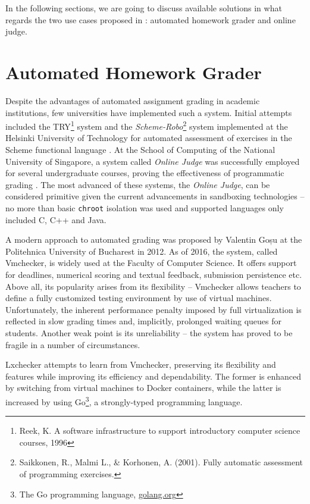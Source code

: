 In the following sections, we are going to discuss available solutions in what regards the two use cases proposed in : automated homework grader and online judge.


\section{Automated Homework Grader}
\label{sec:homework}

Despite the advantages of automated assignment grading in academic institutions, few universities have implemented such a system. Initial attempts included the TRY\footnote{Reek, K. A software infrastructure to support introductory computer science courses, 1996} system and the \textit{Scheme-Robo}\footnote{Saikkonen, R., Malmi L., \& Korhonen, A. (2001). Fully automatic assessment of programming exercises.} system implemented at the Helsinki University of Technology for automated assessment of exercises in the Scheme functional language \cite{cheang}. At the School of Computing of the National University of Singapore, a system called \textit{Online Judge} was successfully employed for several undergraduate courses, proving the effectiveness of programmatic grading \cite{cheang}. The most advanced of these systems, the \textit{Online Judge}, can be considered primitive given the current advancements in sandboxing technologies -- no more than basic \texttt{chroot} isolation was used and supported languages only included C, C++ and Java.

A modern approach to automated grading was proposed by Valentin Goșu\cite{gosu} at the Politehnica University of Bucharest in 2012. As of 2016, the system, called Vmchecker, is widely used at the Faculty of Computer Science. It offers support for deadlines, numerical scoring and textual feedback, submission persistence etc. Above all, its popularity arises from its flexibility -- Vmchecker allows teachers to define a fully customized testing environment by use of virtual machines. Unfortunately, the inherent performance penalty imposed by full virtualization is reflected in slow grading times and, implicitly, prolonged waiting queues for students. Another weak point is its unreliability -- the system has proved to be fragile in a number of circumstances.

Lxchecker attempts to learn from Vmchecker, preserving its flexibility and features while improving its efficiency and dependability. The former is enhanced by switching from virtual machines to Docker containers, while the latter is increased by using Go\footnote{The Go programming language, \url{golang.org}}, a strongly-typed programming language.

